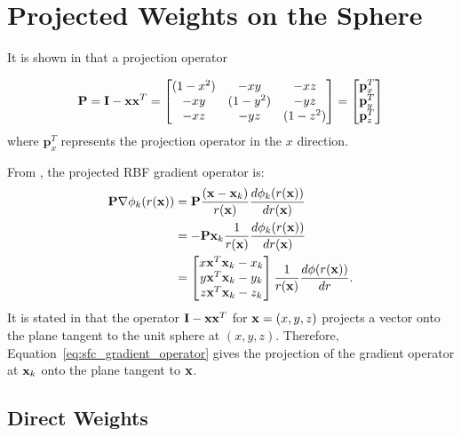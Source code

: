
\chapter{Projected Weights on the Sphere} 
It is shown in \cite{FlyerWright09, FlyerLehto11} that a projection operator

$$ 
\mathbf{P} =  \mathbf{I} - \mathbf{x} \mathbf{x}^{T} = \begin{bmatrix} 
(1 - x^{2}) & -xy & -xz \\ 
-xy & (1 - y^{2}) & -yz \\ 
-xz & -yz & (1-z^{2})
\end{bmatrix} = \begin{bmatrix} \mathbf{p}_{x}^{T} \\ \mathbf{p}_{y}^{T} \\ \mathbf{p}_{z}^{T} \end{bmatrix}
$$
where $\mathbf{p}_{x}^{T}$ represents the projection operator in the $x$ direction. 

From \cite{FlyerWright09}, the projected RBF gradient operator is:
\begin{align}
\mathbf{P} \nabla \phi_{k}(r(\mathbf{x})) & = \mathbf{P}\frac{(\mathbf{x}-\mathbf{x}_{k})}{r(\mathbf{x})} \frac{d \phi_{k}(r(\mathbf{x}))}{d r(\mathbf{x})}  \nonumber \\
& = -\mathbf{P} \mathbf{x}_{k}\frac{1}{r(\mathbf{x})} \frac{d \phi_{k}(r(\mathbf{x}))}{d r(\mathbf{x})} \label{eq:xsfc_negative} \\
& = \begin{bmatrix} x \mathbf{x}^{T} \mathbf{x}_{k} - x_{k} \\  y \mathbf{x}^{T} \mathbf{x}_{k} - y_{k} \\  z \mathbf{x}^{T} \mathbf{x}_{k} - z_{k} \end{bmatrix} \frac{1}{r(\mathbf{x})} \frac{d \phi(r(\mathbf{x}))}{d r} \label{eq:sfc_gradient_operator}.
\end{align}
It is stated in \cite{FlyerWright09} that the operator $\mathbf{I} - \mathbf{x} \mathbf{x}^{T}$ for $\mathbf{x} = (x,y,z)$ projects a vector onto the plane tangent to the unit sphere at $(x,y,z)$. Therefore, Equation~\ref{eq:sfc_gradient_operator} gives the projection of the gradient operator at $\mathbf{x}_{k}$ onto the plane tangent to $\mathbf{x}$. 

\section{Direct Weights} 

